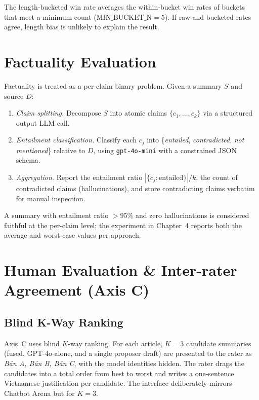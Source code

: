 \noindent The length-bucketed win rate averages the within-bucket win rates
of buckets that meet a minimum count ($\text{MIN\_BUCKET\_N} = 5$). If
raw and bucketed rates agree, length bias is unlikely to explain the
result.

\section{Factuality Evaluation}

Factuality is treated as a per-claim binary problem. Given a summary $S$
and source $D$:

\begin{enumerate}
  \item \textit{Claim splitting.} Decompose $S$ into atomic claims
        $\{c_1, \ldots, c_k\}$ via a structured output LLM call.
  \item \textit{Entailment classification.} Classify each $c_j$ into
        \{\textit{entailed}, \textit{contradicted}, \textit{not mentioned}\}
        relative to $D$, using \texttt{gpt-4o-mini} with a constrained JSON
        schema.
  \item \textit{Aggregation.} Report the entailment ratio
        $|\{c_j : \text{entailed}\}| / k$, the count of contradicted claims
        (hallucinations), and store contradicting claims verbatim for
        manual inspection.
\end{enumerate}

A summary with entailment ratio $> 95\%$ and zero hallucinations is
considered faithful at the per-claim level; the experiment in
Chapter~4 reports both the average and worst-case values per approach.

\section{Human Evaluation \& Inter-rater Agreement (Axis C)}

\subsection{Blind K-Way Ranking}

Axis~C uses blind $K$-way ranking. For each article, $K = 3$ candidate
summaries (fused, GPT-4o-alone, and a single proposer draft) are presented
to the rater as \textit{Bản A, Bản B, Bản C}, with the model identities
hidden. The rater drags the candidates into a total order from best to
worst and writes a one-sentence Vietnamese justification per candidate.
The interface deliberately mirrors Chatbot Arena
\cite{Zheng2023} but for $K = 3$.

